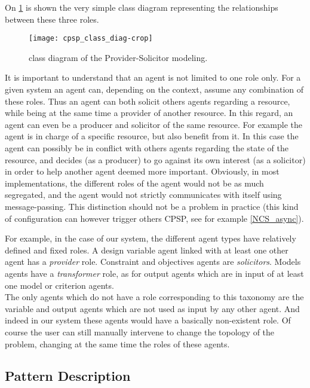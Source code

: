 On \figurename{} \ref{cpsp_class_diag} is shown the very simple class diagram representing the relationships between these three roles.

\begin{figure}
\centering
\texttt{[image: cpsp\_class\_diag-crop]}
\caption{class diagram of the Provider-Solicitor modeling.}
\label{cpsp_class_diag}
\end{figure}

It is important to understand that an agent is not limited to one role only. For a given system an agent can, depending on the context, assume any combination of these roles. Thus an agent can both solicit others agents regarding a resource, while being  at the same time a provider of another resource.
In this regard, an agent can even be a producer and solicitor of the same resource. For example the agent is in charge of a specific resource, but also benefit from it. In this case the agent can possibly be in conflict with others agents regarding the state of the resource, and decides (as a producer) to go against its own interest (as a solicitor) in order to help another agent deemed more important.
Obviously, in most implementations, the different roles of the agent would not be as much segregated, and the agent would not strictly communicates with itself using message-passing. This distinction should not be a problem in practice (this kind of configuration can however trigger others CPSP, see for example \ref{NCS_async}).

For example, in the case of our system, the different agent types have relatively defined and fixed roles. A design variable agent linked with at least one other agent has a \emph{provider} role. Constraint and objectives agents are \emph{solicitors}. Models agents have a \emph{transformer} role, as for output agents which are in input of at least one model or criterion agents.\\
The only agents which do not have a role corresponding to this taxonomy are the variable and output agents which are not used as input by any other agent. And indeed in our system these agents would have a basically non-existent role. Of course the user can still manually intervene to change the topology of the problem, changing at the same time the roles of these agents.

\subsection{Pattern Description}

